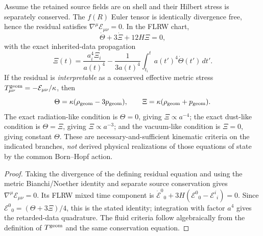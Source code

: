 \documentclass[12pt,a4paper]{article}
\begin{document}
\begin{corollary}
\label{p8:cor:v2167-residual-noether-integrability}
Assume the retained source fields are on shell and their Hilbert stress is
separately conserved.  The \(f(R)\) Euler tensor is identically divergence
free, hence the residual satisfies
\(\nabla^\mu\mathcal E_{\mu\nu}=0\).  In the FLRW chart,
\[
 \boxed{\dot\Theta+3\dot\Xi+12H\Xi=0,}
\]
with the exact inherited-data propagation
\[
 \boxed{\Xi(t)=\frac{a_i^4\Xi_i}{a(t)^4}
 -\frac1{3a(t)^4}\int_{t_i}^t a(t')^4\dot\Theta(t')\,dt'.}
\]
If the residual is \emph{interpretable} as a conserved effective metric
stress \(T^{\rm geom}_{\mu\nu}=-\mathcal E_{\mu\nu}/\kappa\), then
\[
 \Theta=\kappa(\rho_{\rm geom}-3p_{\rm geom}),\qquad
 \Xi=\kappa(\rho_{\rm geom}+p_{\rm geom}).
\]
The exact radiation-like condition is \(\Theta=0\), giving
\(\Xi\propto a^{-4}\); the exact dust-like condition is
\(\Theta=\Xi\), giving \(\Xi\propto a^{-3}\); and the
vacuum-like condition is \(\Xi=0\), giving constant \(\Theta\).
These are necessary-and-sufficient kinematic criteria on the indicated
branches, \emph{not} derived physical realizations of those equations of
state by the common Born--Hopf action.
\end{corollary}
\begin{proof}
Taking the divergence of the defining residual equation and using the
metric Bianchi/Noether identity and separate source conservation gives
\(\nabla^\mu\mathcal E_{\mu\nu}=0\).  Its FLRW mixed time component
is \(\dot{\mathcal E}^0{}_0+3H(\mathcal E^0{}_0-\mathcal E^i{}_i)=0\).
Since \(\mathcal E^0{}_0=(\Theta+3\Xi)/4\), this is the stated
identity; integration with factor \(a^4\) gives the retarded-data
quadrature.  The fluid criteria follow algebraically from the definition
of \(T^{\rm geom}\) and the same conservation equation.
\end{proof}
\end{document}
